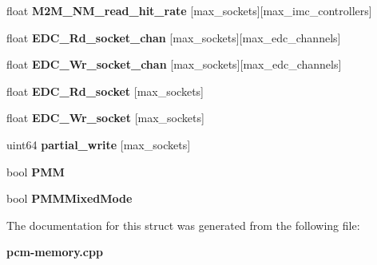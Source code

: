 \begin{DoxyCompactItemize}
\item 
\mbox{\label{structmemdata_a590213379c3babe7ac7c6719f89e81c2}} 
float {\bfseries M2\+M\+\_\+\+N\+M\+\_\+read\+\_\+hit\+\_\+rate} [max\+\_\+sockets][max\+\_\+imc\+\_\+controllers]
\item 
\mbox{\label{structmemdata_a6b56866bb465b62662bf4fa7c1aced10}} 
float {\bfseries E\+D\+C\+\_\+\+Rd\+\_\+socket\+\_\+chan} [max\+\_\+sockets][max\+\_\+edc\+\_\+channels]
\item 
\mbox{\label{structmemdata_a4ca2b57f962b2d0d3649868a1a4199ba}} 
float {\bfseries E\+D\+C\+\_\+\+Wr\+\_\+socket\+\_\+chan} [max\+\_\+sockets][max\+\_\+edc\+\_\+channels]
\item 
\mbox{\label{structmemdata_a43eee155761fbebb23ce86a7ab954fff}} 
float {\bfseries E\+D\+C\+\_\+\+Rd\+\_\+socket} [max\+\_\+sockets]
\item 
\mbox{\label{structmemdata_afe5a628e9ad97b72fd12e7b6de78e784}} 
float {\bfseries E\+D\+C\+\_\+\+Wr\+\_\+socket} [max\+\_\+sockets]
\item 
\mbox{\label{structmemdata_a28e131c751efa29fd9b0670dcbb8e073}} 
uint64 {\bfseries partial\+\_\+write} [max\+\_\+sockets]
\item 
\mbox{\label{structmemdata_a3731ea67c52ae2a5cb11ba014f13cf9b}} 
bool {\bfseries P\+MM}
\item 
\mbox{\label{structmemdata_ab33c003239d2cc468fbc010a78d0bf41}} 
bool {\bfseries P\+M\+M\+Mixed\+Mode}
\end{DoxyCompactItemize}


The documentation for this struct was generated from the following file\+:\begin{DoxyCompactItemize}
\item 
\textbf{ pcm-\/memory.\+cpp}\end{DoxyCompactItemize}
